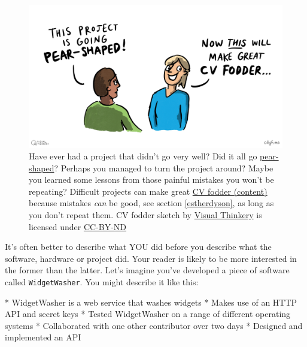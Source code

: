 \documentclass[
]{book}
\newenvironment{Shaded}{\begin{snugshade}}{\end{snugshade}}
\newcommand{\NormalTok}[1]{#1}
\newcommand{\SpecialStringTok}[1]{\textcolor[rgb]{0.31,0.60,0.02}{#1}}
\begin{document}
\begin{figure}

{\centering \includegraphics[width=0.98\linewidth]{images/CV Fodder} 

}

\caption{Have ever had a project that didn't go very well? Did it all go \href{https://en.wikipedia.org/wiki/Pear-shaped}{pear-shaped}? Perhaps you managed to turn the project around? Maybe you learned some lessons from those painful mistakes you won't be repeating? Difficult projects can make great \href{https://en.wikipedia.org/wiki/Fodder}{CV fodder (content)} because mistakes \emph{can} be good, see section \ref{estherdyson}, as long as you don't repeat them. CV fodder sketch by \href{https://visualthinkery.com/}{Visual Thinkery} is licensed under \href{https://creativecommons.org/licenses/by-nd/4.0/}{CC-BY-ND}}\label{fig:cvfodder-fig}
\end{figure}



It's often better to describe what YOU did before you describe what the software, hardware or project did. Your reader is likely to be more interested in the former than the latter. Let's imagine you've developed a piece of software called \texttt{WidgetWasher}. You might describe it like this:

\begin{Shaded}
\begin{Highlighting}[]
\SpecialStringTok{* }\NormalTok{WidgetWasher is a web service that washes widgets}
\SpecialStringTok{* }\NormalTok{Makes use of an HTTP API and secret keys}
\SpecialStringTok{* }\NormalTok{Tested WidgetWasher on a range of different operating systems}
\SpecialStringTok{* }\NormalTok{Collaborated with one other contributor over two days}
\SpecialStringTok{* }\NormalTok{Designed and implemented an API}
\end{Highlighting}
\end{Shaded}
\end{document}

